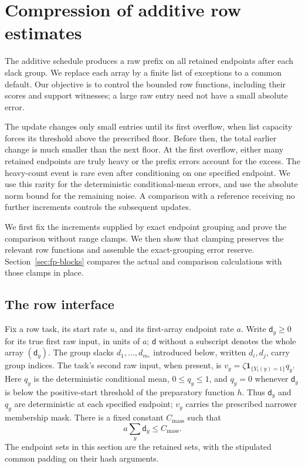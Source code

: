 \section{Compression of additive row estimates}
\label{sec:buf-compression}

The additive schedule produces a raw prefix on all retained endpoints after
each slack group.  We replace each array by a finite list of exceptions to
a common default.  Our objective is to control the bounded row functions,
including their scores and support witnesses; a large raw entry need not
have a small absolute error.

The update changes only small entries until its first overflow, when list
capacity forces its threshold above the prescribed floor.  Before then,
the total earlier change is much smaller than the next floor.  At the
first overflow, either many retained endpoints are truly heavy or the
prefix errors account for the excess.  The heavy-count event is rare even
after conditioning on one specified endpoint.  We use this rarity for the
deterministic conditional-mean errors, and use the absolute norm bound for
the remaining noise.  A comparison with a reference receiving no further increments controls the
subsequent updates.

We first fix the increments supplied by exact endpoint grouping and prove
the comparison without range clamps.  We then show that clamping preserves
the relevant row functions and assemble the exact-grouping error reserve.
Section~\ref{sec:fp-blocks} compares the actual and comparison calculations with
those clamps in place.

\subsection{The row interface}
\label{subsec:buf-interface}
Fix a row task, its start rate $u$, and its first-array endpoint rate $a$.
Write $\mathsf{d}_y\geq0$ for its true first raw input, in units of $a$; $\mathsf{d}$ without
a subscript denotes the whole array $(\mathsf{d}_y)$.  The group slacks $d_1,\ldots,d_{m_*}$ introduced
below, written $d_i,d_j$, carry group indices.  The task's second
raw input, when present, is $v_y=\zeta\mathbf1_{\{Y_t(y)=1\}}q_y$.
Here $q_y$ is the deterministic conditional mean, $0\leq q_y\leq1$, and
$q_y=0$ whenever $\mathsf{d}_y$ is below the positive-start threshold of the
preparatory function $h$.  Thus $\mathsf{d}_y$ and $q_y$ are deterministic at each
specified endpoint; $v_y$ carries the prescribed narrower membership mask.
There is a fixed constant $C_{\mathrm{mass}}$ such that
\begin{equation}
 a\sum_y \mathsf{d}_y\leq C_{\mathrm{mass}}.
 \label{eq:buf-mass}
\end{equation}
The endpoint sets in this section are the retained sets, with the stipulated
common padding on their hash arguments.

